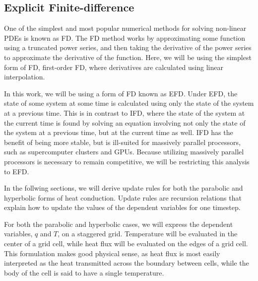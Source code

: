 \documentclass[iop]{emulateapj}
\begin{document}
		\subsection{Explicit Finite-difference}
		
			One of the simplest and most popular numerical methods for solving non-linear \acp{PDE} is known as \ac{FD}.
				The \ac{FD} method works by approximating some function using a truncated power series, and then taking the derivative of the power series to approximate the derivative of the function.
				Here, we will be using the simplest form of \ac{FD}, first-order \ac{FD}, where derivatives are calculated using linear interpolation.
				
			In this work, we will be using a form of \ac{FD} known as \ac{EFD}. 
				Under \ac{EFD}, the state of some system at some time is calculated using only the state of the system at a previous time. 
				This is in contrast to \ac{IFD}, where the state of the system at the current time is found by solving an equation involving not only the state of the system at a previous time, but at the current time as well.
				\ac{IFD} has the benefit of being more stable, but is ill-suited for massively parallel processors, such as supercomputer clusters and \acp{GPU}.
				Because utilizing massively parallel processors is necessary to remain competitive, we will be restricting this analysis to \ac{EFD}.
				
				In the follwing sections, we will derive update rules for both the parabolic and hyperbolic forms of heat conduction.
					Update rules are recursion relations that explain how to update the values of the dependent variables for one timestep.
					
				For both the parabolic and hyperbolic cases, we will express the dependent variables, $q$ and $T$, on a staggered grid.
					Temperature will be evaluated in the center of a grid cell, while heat flux will be evaluated on the edges of a grid cell.
					This formulation makes good physical sense, as heat flux is most easily interpreted as the heat transmitted across the boundary between cells, while the body of the cell is said to have a single temperature.
					
\end{document}
